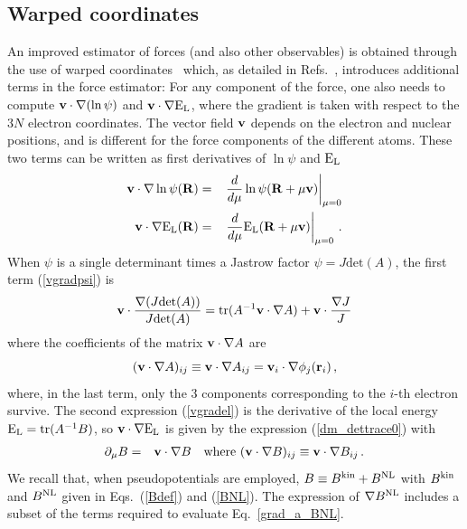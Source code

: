 \documentclass[aip,jcp,reprint,floatfix,onecolumn]{revtex4-1}
\def\det{\text{det}}
\def\tr{\text{tr}}
\begin{document}
\subsection{Warped coordinates}

An improved estimator of forces (and also other observables) is obtained through the use of warped coordinates~\cite{Umrigar89,Filippi00} which, as detailed in Refs.~, introduces additional terms in the force estimator: For any component of the force, one also needs to compute ${\bf v}\cdot{\bf \nabla} (\ln \psi)$ and ${\bf v}\cdot{\bf \nabla}{\rm E}_{\rm L}$,  where the gradient is taken with respect to the $3N$ electron coordinates.
The vector field ${\bf v}$ depends on the electron and nuclear positions, and is different for the force components of the different atoms.
These two terms can be written as first derivatives of $\ln \psi$ and ${\rm E}_{\rm L}$
\begin{eqnarray}
{\bf v}\cdot {\bf \nabla} \ln \psi ({\bf R}) & =&  \left.\frac {d }{d \mu} \ln \psi ({\bf R} + \mu {\bf  v}) \right|_{\mu =0}
\label{vgradpsi} \\
{\bf v}\cdot{\bf \nabla} {\rm E}_{\rm L} ({\bf R})  &=&  \left. \frac {d }{d \mu} {\rm E}_{\rm L} ({\bf R} + \mu {\bf  v}) \right|_{\mu =0}\,.
\label{vgradel}
\end{eqnarray}
When $\psi$ is a single determinant times a Jastrow factor $\psi = J \det (A)$, the first term (\ref{vgradpsi}) is
\begin{equation}
{\bf v}\cdot  \frac{\nabla (J  \det(A))} { J \det(A)}= \tr (A^{-1} {\bf v}\cdot\nabla A) +   {\bf v}\cdot\frac{\nabla J}{J}
\end{equation}
where the coefficients of the matrix ${\bf v}\cdot\nabla A$ are
\begin{equation}
( {\bf v}\cdot\nabla A)_{ij} \equiv {\bf v}\cdot\nabla A_{ij}
=  {\bf v}_i \cdot \nabla \phi_j({\bf r}_i)\,,
\end{equation}
where, in the last term, only the 3 components corresponding to the $i$-th electron survive.
The second expression (\ref{vgradel})  is  the derivative  of the local energy ${\rm E}_{\rm L} = \tr (A^{-1} B)$, so
${\bf v}\cdot{\bf \nabla} {\rm E}_{\rm L}$ is given by the expression (\ref{dm_dettrace0}) with
\begin{eqnarray}
\partial_\mu B & = & {\bf v}\cdot\nabla B \text{ \ \ where  }   ( {\bf v}\cdot\nabla B)_{ij} \equiv  {\bf v}\cdot\nabla B_{ij} \,.
\end{eqnarray}
We recall that, when pseudopotentials are employed, $B \equiv  {B}^{\rm kin} + {B}^{\rm NL}$
with ${B}^{\rm kin}$ and ${B}^{\rm NL}$ given in Eqs.~(\ref{Bdef}) and (\ref{BNL}). The expression of $\nabla {B}^{\rm NL}$ includes a subset of
the terms required to evaluate Eq.~\ref{grad_a_BNL}.
\end{document}
